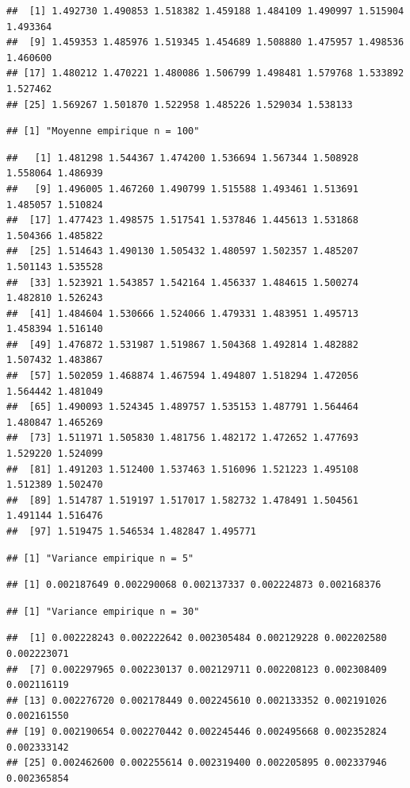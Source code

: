 \documentclass[
]{article}
\begin{document}
\begin{verbatim}
##  [1] 1.492730 1.490853 1.518382 1.459188 1.484109 1.490997 1.515904 1.493364
##  [9] 1.459353 1.485976 1.519345 1.454689 1.508880 1.475957 1.498536 1.460600
## [17] 1.480212 1.470221 1.480086 1.506799 1.498481 1.579768 1.533892 1.527462
## [25] 1.569267 1.501870 1.522958 1.485226 1.529034 1.538133
\end{verbatim}

\begin{verbatim}
## [1] "Moyenne empirique n = 100"
\end{verbatim}

\begin{verbatim}
##   [1] 1.481298 1.544367 1.474200 1.536694 1.567344 1.508928 1.558064 1.486939
##   [9] 1.496005 1.467260 1.490799 1.515588 1.493461 1.513691 1.485057 1.510824
##  [17] 1.477423 1.498575 1.517541 1.537846 1.445613 1.531868 1.504366 1.485822
##  [25] 1.514643 1.490130 1.505432 1.480597 1.502357 1.485207 1.501143 1.535528
##  [33] 1.523921 1.543857 1.542164 1.456337 1.484615 1.500274 1.482810 1.526243
##  [41] 1.484604 1.530666 1.524066 1.479331 1.483951 1.495713 1.458394 1.516140
##  [49] 1.476872 1.531987 1.519867 1.504368 1.492814 1.482882 1.507432 1.483867
##  [57] 1.502059 1.468874 1.467594 1.494807 1.518294 1.472056 1.564442 1.481049
##  [65] 1.490093 1.524345 1.489757 1.535153 1.487791 1.564464 1.480847 1.465269
##  [73] 1.511971 1.505830 1.481756 1.482172 1.472652 1.477693 1.529220 1.524099
##  [81] 1.491203 1.512400 1.537463 1.516096 1.521223 1.495108 1.512389 1.502470
##  [89] 1.514787 1.519197 1.517017 1.582732 1.478491 1.504561 1.491144 1.516476
##  [97] 1.519475 1.546534 1.482847 1.495771
\end{verbatim}

\begin{verbatim}
## [1] "Variance empirique n = 5"
\end{verbatim}

\begin{verbatim}
## [1] 0.002187649 0.002290068 0.002137337 0.002224873 0.002168376
\end{verbatim}

\begin{verbatim}
## [1] "Variance empirique n = 30"
\end{verbatim}

\begin{verbatim}
##  [1] 0.002228243 0.002222642 0.002305484 0.002129228 0.002202580 0.002223071
##  [7] 0.002297965 0.002230137 0.002129711 0.002208123 0.002308409 0.002116119
## [13] 0.002276720 0.002178449 0.002245610 0.002133352 0.002191026 0.002161550
## [19] 0.002190654 0.002270442 0.002245446 0.002495668 0.002352824 0.002333142
## [25] 0.002462600 0.002255614 0.002319400 0.002205895 0.002337946 0.002365854
\end{verbatim}
\end{document}
